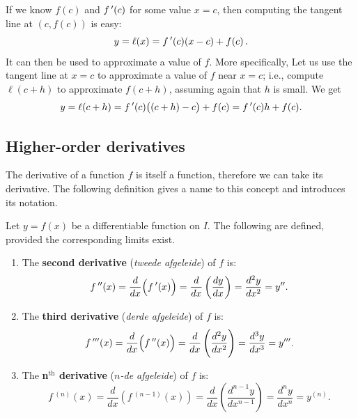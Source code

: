 


If we know $f(c)$ and $f\,'(c)$ for some value $x=c$, then computing the tangent line at $(c,f(c))$ is easy: 
$$y=\ell(x) = f\,'(c)(x-c)+f(c)\,.$$
It can then be used to approximate a value of $f$. More specifically, Let us use the tangent line at $x=c$ to approximate a value of $f$ near $x=c$; i.e., compute $\ell(c+h)$ to approximate $f(c+h)$, assuming again that $h$ is small. We get
$$y=\ell(c+h) = f\,'(c)\big((c+h)-c\big)+f(c) = f\,'(c)h + f(c).$$ 

\fi

\subsection{Higher-order derivatives}
The derivative of a function $f$ is itself a function, therefore we can take its derivative. The following definition gives a name to this concept and introduces its notation.

\begin{definition}\label{def:Higher_Deriv}
Let $y=f(x)$ be a differentiable function on $I$. The following are defined, provided the corresponding limits exist.  
		\begin{enumerate}
		\item		The \textbf{second derivative} (\textit{tweede afgeleide}) of $f$ is: 
						$$ f\,''(x) = \frac{d}{dx}\Big(f\,'(x)\Big) = \frac{d}{dx}\left(\frac{dy}{dx}\right) = \frac{d^2y}{dx^2}=y''.$$
				\item		The \textbf{third derivative} (\textit{derde afgeleide}) of $f$ is: 
						$$ f\,'''(x) = \frac{d}{dx}\Big(f\,''(x)\Big) = \frac{d}{dx}\left(\frac{d^2y}{dx^2}\right) = \frac{d^3y}{dx^3}=y'''.$$
				\item		The \textbf{n$^{\text{th}}$ derivative} (\textit{$n$-de afgeleide}) of $f$ is:
						$$ f\,^{(n)}(x) = \frac{d}{dx}\left(f\,^{(n-1)}(x)\right) = \frac{d}{dx}\left(\frac{d^{n-1}y}{dx^{n-1}}\right) = \frac{d^ny}{dx^n}=y^{(n)}.$$
		\end{enumerate}
\end{definition}

